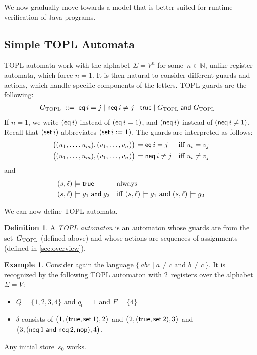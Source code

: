 \documentclass{article} %
\newcommand{\N}{\ensuremath{\mathbb{N}}}
\newcommand{\eoe}{\hskip5mm\null\nobreak\hfill\vrule height1ex width1ex}
\theoremstyle{definition}
\newtheorem{definition}{Definition}
\newtheorem{example}{Example}
\theoremstyle{remark}
\begin{document}
We now gradually move towards a model that is better suited for runtime verification of Java programs.

\subsection{Simple TOPL Automata} %

TOPL automata work with the alphabet $\Sigma=V^n$ for some~$n\in\N$, unlike register automata, which force $n=1$.
It is then natural to consider different guards and actions, which handle specific components of the letters.
TOPL guards are the following:
\begin{align*}
G_{\rm TOPL} &\;::=\; {\sf eq}\,i=j \mid 
{\sf neq}\,i\ne j \mid
 {\sf true} \mid 
G_{\rm TOPL} \mathrel{\sf and} G_{\rm TOPL}
\end{align*}
If $n=1$, we write $({\sf eq}\,i)$ instead of $({\sf eq}\,i=1)$, and $({\sf neq}\,i)$ instead of $({\sf neq}\,i\ne1)$.
Recall that $({\sf set}\,i)$ abbreviates $({\sf set}\,i:=1)$.
The guards are interpreted as follows:
\begin{align*}
\bigl((u_1,\ldots,u_m),(v_1,\ldots,v_n)\bigr) &\models {\sf eq}\,i=j
  &&\text{iff $u_i=v_j$} \\
\bigl((u_1,\ldots,u_m),(v_1,\ldots,v_n)\bigr) &\models {\sf neq}\,i\ne j
  &&\text{iff $u_i\ne v_j$}
\end{align*}
and
\begin{align*}
(s,\ell) &\models {\sf true}
  &&\text{always} \\
(s,\ell) &\models g_1\mathrel{\sf and} g_2
  &&\text{iff $(s,\ell)\models g_1$ and $(s,\ell)\models g_2$}
\end{align*}

We can now define TOPL automata.

\begin{definition}
A \emph{TOPL automaton} is an automaton whose guards are from the set~$G_{\rm TOPL}$ (defined above) and whose actions are sequences of assignments (defined in \autoref{sec:overview}).
\end{definition}

\begin{example}\label{ex:topl1}
Consider again the language $\{\,abc\mid\text{$a\ne c$ and $b\ne c$}\,\}$.
It is recognized by the following TOPL automaton with $2$~registers over the alphabet $\Sigma=V$:
\begin{itemize}
\item $Q=\{1,2,3,4\}$ and $q_0=1$ and $F=\{4\}$
\item $\delta$ consists of
  $\bigl(1,({\sf true}, {\sf set}\,1),2\bigr)$
  and $\bigl(2,({\sf true}, {\sf set}\,2),3\bigr)$
  and $\bigl(3,({\sf neq}\,1\mathrel{\sf and}{\sf neq}\,2, {\sf nop}),4\bigr)$.
\end{itemize}
Any initial store~$s_0$ works.
\eoe
\end{example}
\end{document}
